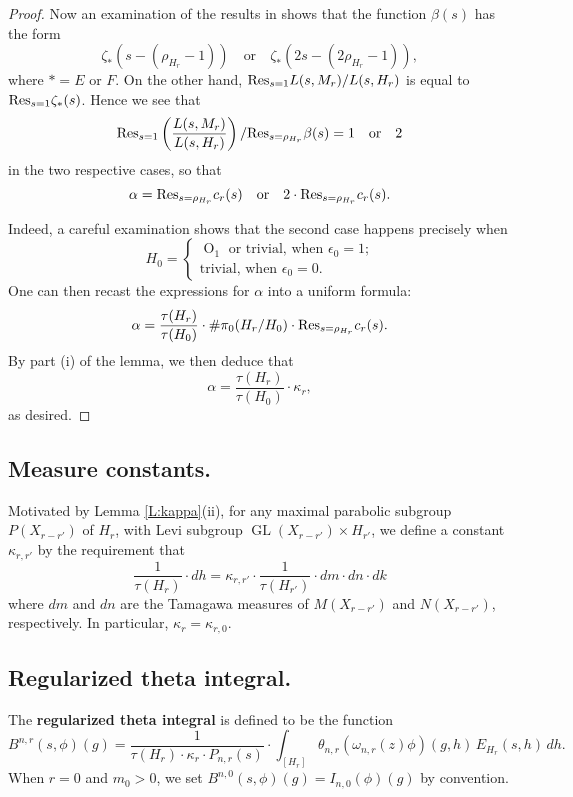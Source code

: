 \documentclass[10pt]{amsart}
\theoremstyle{plain}
\numberwithin{equation}{section}
\begin{document}
\begin{proof}
 Now an examination of the results in \cite{Ik, I1, I2} shows that the function $\beta(s)$ has the form
 \[  \zeta_{\ast}(s - (\rho_{H_r} -1)) \quad \text{or} \quad \zeta_{\ast}(2s - (2 \rho_{H_r}-1)), \]
 where $\ast = E$ or $F$.   
 On the other hand,   ${\rm Res}_{s=1} L(s, M_r) / L(s, H_r)$ is  equal to 
 ${\rm Res}_{s=1} \zeta_{\ast}(s)$. Hence we see that 
 \[  {\rm Res}_{s=1} \left( \frac{L(s, M_r)}{L(s, H_r)} \right) /
{\rm Res}_{s = \rho_{H_r}} \beta(s)  = 1 \quad \text{or}  \quad 2  \]
in the two respective cases, so that
\[  \alpha = {\rm Res}_{s= \rho_{H_r}} c_r(s) \quad \text{or} \quad 2 \cdot {\rm Res}_{s= \rho_{H_r}} c_r(s).\]
\vskip 5pt

Indeed, a careful examination shows that the second case happens precisely when
\[  H_0 = \begin{cases}
\text{${\operatorname{O}}_1$ or trivial, when $\epsilon_0  =1$;} \\
\text{trivial, when $\epsilon_0 = 0$.} 
\end{cases} \]
One can then recast the expressions for $\alpha$ into a uniform formula:
\[  \alpha = \frac{\tau(H_r)}{\tau(H_0)} \cdot  \# \pi_0(H_r/ H_0) \cdot  {\rm Res}_{s= \rho_{H_r}} c_r(s).\]
By part (i) of the lemma, we then deduce that
\[  \alpha =  \frac{\tau(H_r)}{\tau(H_0)} \cdot \kappa_r, \]
as desired.
\end{proof}
\vskip 5pt

\subsection{\bf Measure constants.}
Motivated by Lemma \ref{L:kappa}(ii), for any maximal parabolic
subgroup $P(X_{r-r'})$ of $H_r$, with Levi subgroup ${\operatorname{GL}}(X_{r-r'})
\times H_{r'}$, we define a constant $\kappa_{r,r'}$ by the
requirement that
\begin{equation} \label{E:iwasawa}
\frac{1}{\tau(H_r)} \cdot   dh  = \kappa_{r,r'} \cdot \frac{1}{\tau(H_{r'})}  \cdot dm \cdot  dn \cdot dk \end{equation}
where $dm$ and $dn$ are the Tamagawa measures of $M(X_{r-r'})$ and
$N(X_{r-r'})$, respectively. In particular, $\kappa_r = \kappa_{r,0}$.
\vskip 5pt

\subsection{\bf Regularized theta integral.}
The {\bf regularized theta integral} is defined to be the function
\[  
B^{n,r}(s, \phi)(g) =  \frac{1}{\tau(H_r)  \cdot \kappa_r \cdot P_{n,r}(s)} \cdot
\int_{[H_r]} \theta_{n,r}( \omega_{n,r}(z)  \phi)(g,h)\,  E_{H_r}(s,h) \, dh. 
\]
When $r=0$ and $m_0>0$, we set $B^{n,0}(s,\phi)(g)=I_{n,0}(\phi)(g)$ by convention.
\end{document}
